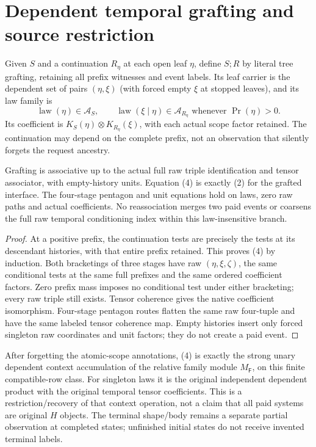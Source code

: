 \documentclass[11pt]{article}\usepackage{amsmath,amssymb,amsthm,geometry}\geometry{margin=1in}
\begin{document}
\section{Dependent temporal grafting and source restriction}
Given $S$ and a continuation $R_\eta$ at each open leaf $\eta$, define $S;R$ by literal tree grafting, retaining all prefix witnesses and event labels. Its leaf carrier is the dependent set of pairs $(\eta,\xi)$ (with forced empty $\xi$ at stopped leaves), and its law family is
\[
 \operatorname{law}(\eta)\in\mathcal A_S,\qquad
 \operatorname{law}(\xi\mid\eta)\in\mathcal A_{R_\eta}
                       \text{ whenever }\Pr(\eta)>0.                \tag{4}
\]
Its coefficient is $K_S(\eta)\otimes K_{R_\eta}(\xi)$, with each actual scope factor retained. The continuation may depend on the complete prefix, not an observation that silently forgets the request ancestry.

\begin{theorem}
Grafting is associative up to the actual full raw triple identification and tensor associator, with empty-history units. Equation (4) is exactly (2) for the grafted interface. The four-stage pentagon and unit equations hold on laws, zero raw paths and actual coefficients. No reassociation merges two paid events or coarsens the full raw temporal conditioning index within this law-insensitive branch.
\end{theorem}
\begin{proof}
At a positive prefix, the continuation tests are precisely the tests at its descendant histories, with that entire prefix retained. This proves (4) by induction. Both bracketings of three stages have raw $(\eta,\xi,\zeta)$, the same conditional tests at the same full prefixes and the same ordered coefficient factors. Zero prefix mass imposes no conditional test under either bracketing; every raw triple still exists. Tensor coherence gives the native coefficient isomorphism. Four-stage pentagon routes flatten the same raw four-tuple and have the same labeled tensor coherence map. Empty histories insert only forced singleton raw coordinates and unit factors; they do not create a paid event.\end{proof}

After forgetting the atomic-scope annotations, (4) is exactly the strong unary dependent context accumulation of the relative family module $M_{\mathsf F}$, on this finite compatible-row class. For singleton laws it is the original independent dependent product with the original temporal tensor coefficients. This is a restriction/recovery of that context operation, not a claim that all paid systems are original $H$ objects. The terminal shape/body remains a separate partial observation at completed states; unfinished initial states do not receive invented terminal labels.
\end{document}
